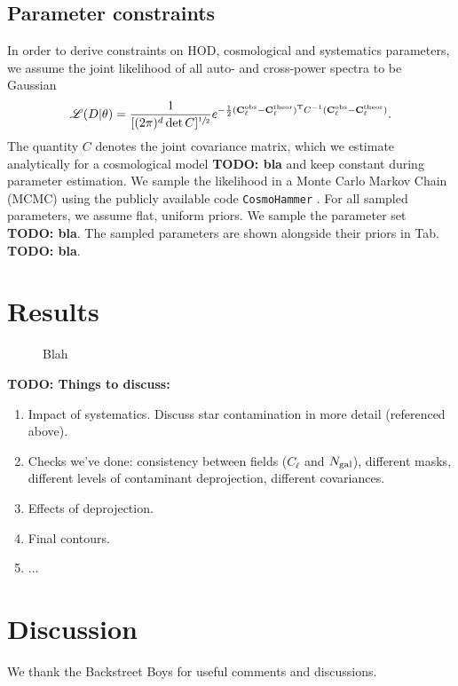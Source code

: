 \documentclass[a4paper,11pt]{article}
\newcommand{\todo}[1]{{\bf TODO: #1}}
\begin{document}
\subsection{Parameter constraints}\label{ssec:methods.constr}
In order to derive constraints on HOD, cosmological and systematics parameters, we assume the joint likelihood of all auto- and cross-power spectra to be Gaussian 
\begin{align}
\mathscr{L}(D \vert \theta) = \frac{1}{[(2\pi)^{d}\det{C}]^{\sfrac{1}{2}}} e^{-\frac{1}{2}(\mathbf{C}^{\mathrm{obs}}_{\ell}-\mathbf{C}^{\mathrm{theor}}_{\ell})^{\mathrm{T}}C^{-1}(\mathbf{C}^{\mathrm{obs}}_{\ell}-\mathbf{C}^{\mathrm{theor}}_{\ell})}.
\label{eq:likelihood}
\end{align}
The quantity $C$ denotes the joint covariance matrix, which we estimate analytically for a cosmological model \todo{bla} and keep constant during parameter estimation.
We sample the likelihood in a Monte Carlo Markov Chain (MCMC) using the publicly available code \texttt{CosmoHammer} \cite{Akeret:2013}. For all sampled parameters, we assume flat, uniform priors. We sample the parameter set \todo{bla}. The sampled parameters are shown alongside their priors in Tab. \todo{bla}.


\section{Results}\label{sec:results}
  \lipsum[8]
  \begin{figure}
    \centering
    \caption{Blah}\label{fig:token}
  \end{figure}
  \todo{Things to discuss:}
  \begin{enumerate}
    \item Impact of systematics. Discuss star contamination in more detail (referenced above).
    \item Checks we've done: consistency between fields ($C_\ell$ and $N_{\rm gal}$), different masks, different levels of contaminant deprojection, different covariances.
    \item Effects of deprojection.
    \item Final contours.
    \item ...
  \end{enumerate}

\section{Discussion}\label{sec:discussion}
  \lipsum[9]

\acknowledgments

We thank the Backstreet Boys for useful comments and discussions.


\end{document}
